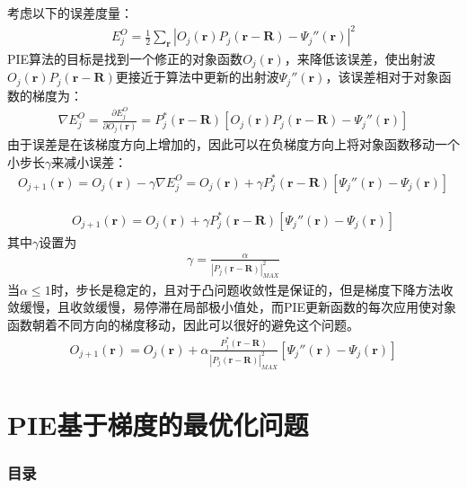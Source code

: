 \documentclass[10pt,aspectratio=169]{beamer} %
\renewcommand{\vec}[1]{\boldsymbol{#1}} %
\begin{document}
\begin{frame}
    考虑以下的误差度量：
    \begin{align*}
        E_j^O = \frac{1}{2} \sum _{\vec{r}} |O_j(\vec{r})P_j(\vec{r}-\vec{R})-\Psi _j''(\vec{r})|^2
    \end{align*}
    PIE算法的目标是找到一个修正的对象函数$O_j(\vec{r})$，来降低该误差，使出射波$O_j(\vec{r})P_j(\vec{r}-\vec{R})$更接近于算法中更新的出射波$\Psi _j''(\vec{r})$，该误差相对于对象函数的梯度为：
    \begin{align*}
        \nabla E_j^O = \frac{\partial E_j^O}{\partial O_j(\vec{r})} = P_j^*(\vec{r}-\vec{R}) [O_j(\vec{r})P_j(\vec{r}-\vec{R})-\Psi _j''(\vec{r})]
    \end{align*}
    由于误差是在该梯度方向上增加的，因此可以在负梯度方向上将对象函数移动一个小步长$\gamma$来减小误差：
    \begin{align*}
        O_{j+1}(\vec{r}) = O_{j}(\vec{r}) - \gamma \nabla E_j^O = O_{j}(\vec{r}) + \gamma P_j^*(\vec{r}-\vec{R}) [\Psi _j''(\vec{r}) - \Psi _j(\vec{r})]
    \end{align*}
\end{frame}

\begin{frame}
    \begin{align*}
        O_{j+1}(\vec{r}) = O_{j}(\vec{r}) + \gamma P_j^*(\vec{r}-\vec{R}) [\Psi _j''(\vec{r}) - \Psi _j(\vec{r})]
    \end{align*}
    其中$\gamma$设置为
    \begin{align*}
        \gamma=\frac{\alpha}{|P_j(\vec{r}-\vec{R})|_{MAX}^2}
    \end{align*}
    当$\alpha \leq 1$时，步长是稳定的，且对于凸问题收敛性是保证的，但是梯度下降方法收敛缓慢，且收敛缓慢，易停滞在局部极小值处，而PIE更新函数的每次应用使对象函数朝着不同方向的梯度移动，因此可以很好的避免这个问题。
    \begin{align*}
        O_{j+1}(\vec{r}) =O_{j}(\vec{r})+\alpha \frac{P_j^*(\vec{r}-\vec{R})}{|P_j(\vec{r}-\vec{R})|_{MAX}^2}[\Psi _{j}''(\vec{r})-\Psi _{j}(\vec{r})]
    \end{align*}
    
    
\end{frame}

\section{PIE基于梯度的最优化问题}

\begin{frame}
    \frametitle{目录}
    \tableofcontents[currentsection,subsectionstyle=hide]
\end{frame}
\end{document}
